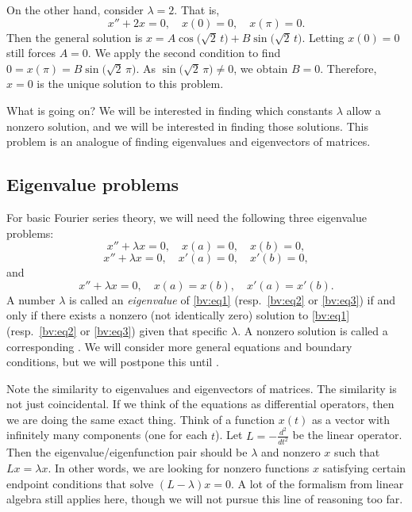 \begin{example}
On the other hand, consider $\lambda = 2$.  That is,
\begin{equation*}
x'' + 2 x = 0, \quad x(0) = 0, \quad x(\pi) = 0.
\end{equation*}
Then the general solution is
$x= A \cos \bigl( \sqrt{2}\,t\bigr)
+ B \sin \bigl( \sqrt{2}\,t\bigr)$.
Letting $x(0) = 0$ still forces $A = 0$.
We apply the second condition to find
$0=x(\pi) = B \sin \bigl( \sqrt{2}\,\pi\bigr)$.
As $\sin \bigl( \sqrt{2}\,\pi\bigr) \neq 0$, we obtain
$B = 0$.  Therefore, $x=0$ is the unique solution to this problem.
\end{example}

What is going on?  We will be interested in finding which
constants $\lambda$ allow a nonzero solution, and we will be interested in
finding those solutions.  This problem is an analogue of finding
eigenvalues and eigenvectors of matrices.  

\subsection{Eigenvalue problems}

For basic Fourier series theory, we will need
the following three eigenvalue problems:
\begin{equation} \label{bv:eq1}
x'' + \lambda x = 0, \quad x(a) = 0, \quad x(b) = 0 ,
\end{equation}
\begin{equation} \label{bv:eq2}
x'' + \lambda x = 0, \quad x'(a) = 0, \quad x'(b) = 0 ,
\end{equation}
and
\begin{equation} \label{bv:eq3}
x'' + \lambda x = 0, \quad x(a) = x(b), \quad x'(a) = x'(b) .
\end{equation}
A number $\lambda$ is called an
\emph{eigenvalue}
of \eqref{bv:eq1}
(resp.\ \eqref{bv:eq2} or \eqref{bv:eq3}) if and only if
there exists a nonzero (not identically zero) solution to \eqref{bv:eq1}
(resp.\ \eqref{bv:eq2} or \eqref{bv:eq3})
given that specific $\lambda$.  A
nonzero solution is called a corresponding
\emph{}.
We will consider more general equations and boundary conditions,
but we will postpone this until
.

Note the similarity to eigenvalues and eigenvectors of matrices.  The
similarity is not just coincidental.  If we think of the equations as
differential operators, then we are doing the same exact thing.
Think of a function $x(t)$
as a vector with infinitely many components (one for each $t$).
Let $L = -\frac{d^2}{{dt}^2}$ be the linear operator.
Then the eigenvalue/eigenfunction pair should be $\lambda$ and
nonzero $x$ such that $Lx = \lambda x$.
In other words,
we are looking for nonzero functions $x$
satisfying certain endpoint conditions that solve
$(L- \lambda)x = 0$.  A lot of the formalism from linear algebra still
applies here, though we will not pursue this line of reasoning too far.

